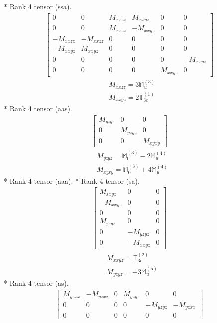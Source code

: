 \documentclass[fleqn,8pt,landscape]{jsarticle}
\begin{document}
* Rank 4 tensor (ssa).
\begin{align*}
\begin{bmatrix} 0 & 0 & M_{xxzz} & M_{xxyz} & 0 & 0 \\ 0 & 0 & M_{xxzz} & - M_{xxyz} & 0 & 0 \\ - M_{xxzz} & - M_{xxzz} & 0 & 0 & 0 & 0 \\ - M_{xxyz} & M_{xxyz} & 0 & 0 & 0 & 0 \\ 0 & 0 & 0 & 0 & 0 & - M_{xxyz} \\ 0 & 0 & 0 & 0 & M_{xxyz} & 0 \end{bmatrix}
\end{align*}
\begin{align*}
& M_{xxzz} = 3 \mathbb{M}_{u}^{(3)} \\
& M_{xxyz} = 2 \mathbb{T}_{3c}^{(1)}
\end{align*}
* Rank 4 tensor (aas).
\begin{align*}
\begin{bmatrix} M_{yzyz} & 0 & 0 \\ 0 & M_{yzyz} & 0 \\ 0 & 0 & M_{xyxy} \end{bmatrix}
\end{align*}
\begin{align*}
& M_{yzyz} = \mathbb{M}_{0}^{(3)} - 2 \mathbb{M}_{u}^{(4)} \\
& M_{xyxy} = \mathbb{M}_{0}^{(3)} + 4 \mathbb{M}_{u}^{(4)}
\end{align*}
* Rank 4 tensor (aaa).
* Rank 4 tensor (sa).
\begin{align*}
\begin{bmatrix} M_{xxyz} & 0 & 0 \\ - M_{xxyz} & 0 & 0 \\ 0 & 0 & 0 \\ M_{yzyz} & 0 & 0 \\ 0 & - M_{yzyz} & 0 \\ 0 & - M_{xxyz} & 0 \end{bmatrix}
\end{align*}
\begin{align*}
& M_{xxyz} = \mathbb{T}_{3c}^{(2)} \\
& M_{yzyz} = - 3 \mathbb{M}_{u}^{(5)}
\end{align*}
* Rank 4 tensor (as).
\begin{align*}
\begin{bmatrix} M_{yzxx} & - M_{yzxx} & 0 & M_{yzyz} & 0 & 0 \\ 0 & 0 & 0 & 0 & - M_{yzyz} & - M_{yzxx} \\ 0 & 0 & 0 & 0 & 0 & 0 \end{bmatrix}
\end{align*}
\end{document}
